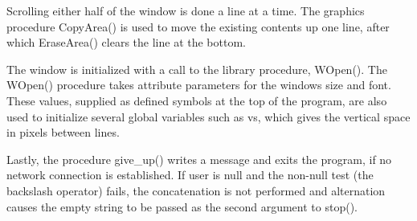 Scrolling either half of the window is done a line at a time. The
graphics procedure \textsf{CopyArea()} is used to move the existing
contents up one line, after which \textsf{EraseArea()} clears the line
at the bottom.


The window is initialized with a call to the library procedure,
\textsf{WOpen()}. The \textsf{WOpen()} procedure takes attribute
parameters for the window{\textquotesingle}s size and font. These
values, supplied as defined symbols at the top of the program, are also
used to initialize several global variables such as \textsf{vs}, which
gives the vertical space in pixels between lines.


Lastly, the procedure \textsf{give\_up()} writes a message and exits the
program, if no network connection is established. If \textsf{user} is
null and the non-null test (the backslash operator) fails, the
concatenation is not performed and alternation causes the empty string to be passed as the
second argument to \textsf{stop()}.


